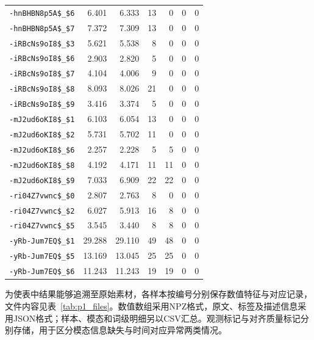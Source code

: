 \begin{longtable}{@{}lrrrrrr@{}}
\nolinkurl{-hnBHBN8p5A$_$6} & 6.401 & 6.333 & 13 & 0 & 0 & 0\\
\nolinkurl{-hnBHBN8p5A$_$7} & 7.372 & 7.309 & 13 & 0 & 0 & 0\\
\nolinkurl{-iRBcNs9oI8$_$3} & 5.621 & 5.538 & 8 & 0 & 0 & 0\\
\nolinkurl{-iRBcNs9oI8$_$6} & 2.903 & 2.820 & 5 & 0 & 0 & 0\\
\nolinkurl{-iRBcNs9oI8$_$7} & 4.104 & 4.006 & 9 & 0 & 0 & 0\\
\nolinkurl{-iRBcNs9oI8$_$8} & 8.093 & 8.026 & 21 & 0 & 0 & 0\\
\nolinkurl{-iRBcNs9oI8$_$9} & 3.416 & 3.374 & 5 & 0 & 0 & 0\\
\nolinkurl{-mJ2ud6oKI8$_$1} & 6.103 & 6.054 & 13 & 0 & 0 & 0\\
\nolinkurl{-mJ2ud6oKI8$_$2} & 5.731 & 5.702 & 11 & 0 & 0 & 0\\
\nolinkurl{-mJ2ud6oKI8$_$6} & 2.257 & 2.228 & 5 & 5 & 0 & 0\\
\nolinkurl{-mJ2ud6oKI8$_$8} & 4.192 & 4.171 & 11 & 11 & 0 & 0\\
\nolinkurl{-mJ2ud6oKI8$_$9} & 7.033 & 6.909 & 22 & 22 & 0 & 0\\
\nolinkurl{-ri04Z7vwnc$_$0} & 2.807 & 2.763 & 8 & 0 & 0 & 0\\
\nolinkurl{-ri04Z7vwnc$_$2} & 6.027 & 5.913 & 16 & 8 & 0 & 0\\
\nolinkurl{-ri04Z7vwnc$_$5} & 3.545 & 3.440 & 8 & 8 & 0 & 0\\
\nolinkurl{-yRb-Jum7EQ$_$1} & 29.288 & 29.110 & 49 & 48 & 0 & 0\\
\nolinkurl{-yRb-Jum7EQ$_$5} & 13.169 & 13.045 & 25 & 25 & 0 & 0\\
\nolinkurl{-yRb-Jum7EQ$_$6} & 11.243 & 11.243 & 19 & 19 & 0 & 0\\
\end{longtable}
\endgroup


为使表中结果能够追溯至原始素材，各样本按编号分别保存数值特征与对应记录，文件内容见表~\ref{tab:p1_files}。数值数组采用NPZ格式，原文、标签及描述信息采用JSON格式；样本、模态和词级明细另以CSV汇总。观测标记与对齐质量标记分别存储，用于区分模态信息缺失与时间对应异常两类情况。

